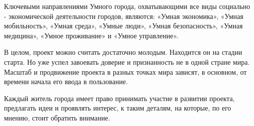 Ключевыми направлениями Умного города, охватывающими все виды социально - экономической деятельности городов, являются: «Умная экономика», «Умная мобильность», «Умная среда», «Умные люди», «Умная безопасность», «Умная медицина», «Умное проживание» и «Умное управление». 

В целом, проект можно считать достаточно молодым. Находится он на стадии старта. Но уже успел завоевать доверие и признанность не в одной стране мира. Масштаб и продвижение проекта в разных точках мира зависят, в основном, от времени начала его ввода в пользование. 

Каждый житель города имеет право принимать участие в развитии проекта, предлагать идеи и проявлять интерес, к таким деталям, на которые, по его мнению, стоит обратить внимание. 